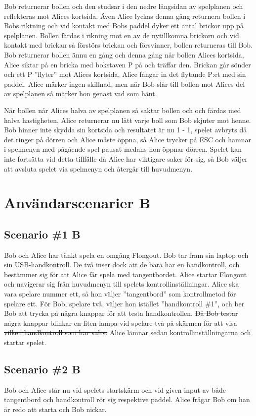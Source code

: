 \documentclass[a4paper,11pt]{article}
\begin{document}
Bob returnerar bollen och den studsar i den nedre långsidan av spelplanen och reflekteras mot Alices kortsida.
Även Alice lyckas denna gång returnera bollen i Bobs riktning och vid kontakt med Bobs paddel dyker ett antal brickor upp på spelplanen.
Bollen färdas i rikning mot en av de nytillkomna brickorn och vid kontakt med brickan så förstörs brickan och försvinner, bollen returneras till Bob.
Bob returnerar bollen ännu en gång och denna gång når bollen Alices kortsida, Alice siktar på en bricka med bokstaven P på och träffar den.
Brickan går sönder och ett P ''flyter'' mot Alices kortsida, Alice fångar in det flytande P:et med sin paddel.
Alice märker ingen skillnad, men när Bob slår till bollen mot Alices del av spelplanen så märker hon genast vad som hänt.

När bollen når Alices halva av spelplanen så saktar bollen och och färdas med halva hastigheten, Alice returnerar nu lätt varje boll som Bob skjuter mot henne.
Bob hinner inte skydda sin kortsida och resultatet är nu 1 - 1, spelet avbryts då det ringer på dörren och Alice måste öppna, så Alice trycker på ESC och hamnar i 
spelmenyn med pågående spel pausat medans hon öppnar dörren.
Spelet kan inte fortsätta vid detta tillfälle då Alice har viktigare saker för sig, så Bob väljer att avsluta spelet via spelmenyn och återgår till huvudmenyn.

\section{Användarscenarier B}
\subsection{Scenario \#1 B}
Bob och Alice har tänkt spela en omgång Flongout. Bob tar fram sin laptop och sin USB-handkontroll.
De två inser dock att de bara har en handkontroll, och bestämmer sig för att Alice får spela med
tangentbordet. Alice startar Flongout och navigerar sig från huvudmenyn till spelets
kontrollinställningar. Alice ska vara spelare nummer ett, så hon väljer ''tangentbord'' som
kontrollmetod för spelare ett. För Bob, spelare två, väljer hon istället ''handkontroll \#1'', och
ber Bob att trycka på några knappar för att testa handkontrollen. \sout{Då Bob testar några knappar
blinkar en liten lampa vid spelare två på skärmen för att visa vilken handkontroll som har valts.}
Alice lämnar sedan kontrollinställningarna och startar spelet.

\subsection{Scenario \#2 B}
Bob och Alice står nu vid spelets startskärm och vid given input av både tangentbord och handkontroll
rör sig respektive paddel. Alice frågar Bob om han är redo att starta och Bob nickar.
\end{document}
